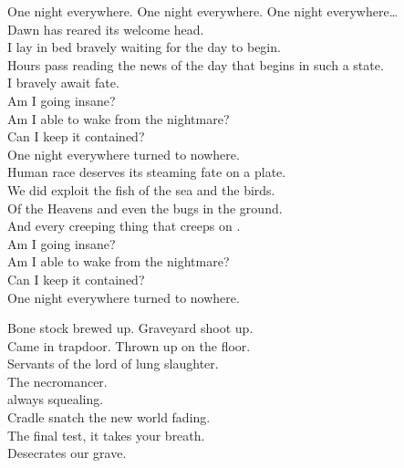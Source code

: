 


One night everywhere. One night everywhere. One night everywhere… \\

Dawn has reared its welcome head. \\
I lay in bed bravely waiting for the day to begin. \\

Hours pass reading the news of the day that begins in such a state. \\
I bravely await fate. \\

Am I going insane? \\
Am I able to wake from the nightmare? \\
Can I keep it contained? \\
One night everywhere turned to nowhere. \\

Human race deserves its steaming fate on a plate. \\
We did exploit the fish of the sea and the birds. \\
Of the Heavens and even the bugs in the ground. \\
And every creeping thing that creeps on . \\

Am I going insane? \\
Am I able to wake from the nightmare? \\
Can I keep it contained? \\
One night everywhere turned to nowhere. \\




Bone stock brewed up. Graveyard shoot up. \\
Came in trapdoor. Thrown up on the floor. \\
Servants of the lord of lung slaughter. \\
The necromancer. \\

 always squealing. \\
Cradle snatch the new world fading. \\
The final test, it takes your breath. \\
Desecrates our grave. \\

